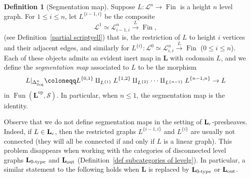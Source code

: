 \documentclass{amsart}
\numberwithin{theorem}{subsection}
\theoremstyle{definition}
\newtheorem{definition}[theorem]{Definition}
\providecommand{\op}{\mathrm{op}}
\newcommand{\xFun}{\operatorname{Fun}}
\newcommand{\finset}{\operatorname{Fin}}
\newcommand{\xS}{\mathcal{S}}
\newcommand{\name}[1]{\ensuremath{\text{\textup{#1}}}}
\newcommand{\levelg}{\mathbf{L}}
\newcommand{\levelgconn}{\levelg_{\name{c}}}
\newcommand{\Seg}{\name{Seg}}
\newcommand{\scriptyell}{\mathscr L}
\begin{document}
\begin{definition}[Segmentation map]\label{def segmentation map}
Suppose $L \colon \scriptyell^n \to \finset$ is a height $n$ level graph. 
For $1\leq i \leq n$, let $L^{\{i-1,i\}}$ be the composite 
\[ \scriptyell^1 \simeq \scriptyell^n_{i-1,i} \xrightarrow{L} \finset, \]
(see Definition~\ref{partial scriptyell}) that is, the restriction of $L$ to height $i$ vertices and their adjacent edges, and similarly for $L^{\{i\}} \colon \scriptyell^0 \simeq \scriptyell^n_{i,i} \xrightarrow{L} \finset$ ($0\leq i \leq n$).
Each of these objects admits an evident inert map in $\levelg$ with codomain $L$, and we define the \emph{segmentation map} associated to $L$ to be the morphism
\[
L|_{\Delta^n_{\Seg}} \coloneqq L^{\{0,1\}} \amalg_{L^{\{1\}}} L^{\{1,2\}} \amalg_{L^{\{2\}}} \cdots
			\amalg_{L^{\{n-1\}}} L^{\{n-1,n\}} \to L
\]
in $\xFun(\levelg^{\op},\xS)$.
In particular, when $n\leq 1$, the segmentation map is the identity.
\end{definition}

Observe that we do not define segmentation maps in the setting of $\levelgconn$-presheaves.
Indeed, if $L\in \levelgconn$, then the restricted graphs $L^{\{i-1,i\}}$ and $L^{\{i\}}$ are usually not connected (they will all be connected if and only if $L$ is a linear graph).
This problem disappears when working with the categories of disconnected level graphs $\levelg_{\name{0-type}}$ and $\levelg_{\name{out}}$ (Definition~\ref{def subcategories of levelg}).
In particular, a similar statement to the following holds when $\levelg$ is replaced by $\levelg_{\name{0-type}}$ or $\levelg_{\name{out}}$.
\end{document}
